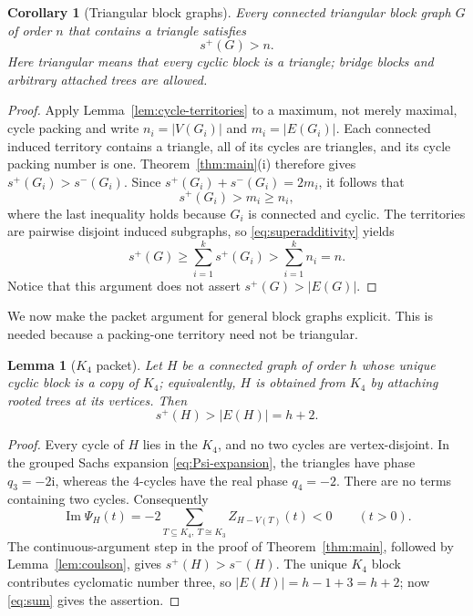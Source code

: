 \documentclass[11pt]{article}
\newtheorem{lemma}[theorem]{Lemma}
\newtheorem{corollary}[theorem]{Corollary}
\theoremstyle{definition}
\theoremstyle{remark}
\newcommand{\ii}{\mathrm{i}}
\begin{document}
\begin{corollary}[Triangular block graphs]\label{cor:triangular-block}
Every connected triangular block graph $G$ of order $n$ that contains a
triangle satisfies
\[
 s^+(G)>n.
\]
Here triangular means that every cyclic block is a triangle; bridge blocks
and arbitrary attached trees are allowed.
\end{corollary}

\begin{proof}
Apply Lemma~\ref{lem:cycle-territories} to a maximum, not merely maximal,
cycle packing and write $n_i=|V(G_i)|$ and $m_i=|E(G_i)|$.  Each connected
induced territory contains a triangle, all of its cycles are triangles, and
its cycle packing number is one.  Theorem~\ref{thm:main}(i) therefore gives
$s^+(G_i)>s^-(G_i)$.  Since
$s^+(G_i)+s^-(G_i)=2m_i$, it follows that
\[
 s^+(G_i)>m_i\ge n_i,
\]
where the last inequality holds because $G_i$ is connected and cyclic.
The territories are pairwise disjoint induced subgraphs, so
\eqref{eq:superadditivity} yields
\[
 s^+(G)\ge\sum_{i=1}^k s^+(G_i)
 >\sum_{i=1}^k n_i=n.
\]
Notice that this argument does not assert $s^+(G)>|E(G)|$.
\end{proof}

We now make the packet argument for general block graphs explicit.  This is
needed because a packing-one territory need not be triangular.

\begin{lemma}[$K_4$ packet]\label{lem:K4-packet}
Let $H$ be a connected graph of order $h$ whose unique cyclic block is a
copy of $K_4$; equivalently, $H$ is obtained from $K_4$ by attaching rooted
trees at its vertices.  Then
\[
 s^+(H)>|E(H)|=h+2.
\]
\end{lemma}

\begin{proof}
Every cycle of $H$ lies in the $K_4$, and no two cycles are vertex-disjoint.
In the grouped Sachs expansion \eqref{eq:Psi-expansion}, the triangles have
phase $q_3=-2\ii$, whereas the $4$-cycles have the real phase $q_4=-2$.
There are no terms containing two cycles.  Consequently
\[
 \operatorname{Im}\Psi_H(t)
 =-2\sum_{T\subseteq K_4,\ T\cong K_3}Z_{H-V(T)}(t)<0
 \qquad(t>0).
\]
The continuous-argument step in the proof of Theorem~\ref{thm:main}, followed
by Lemma~\ref{lem:coulson}, gives $s^+(H)>s^-(H)$.  The unique $K_4$ block
contributes cyclomatic number three, so $|E(H)|=h-1+3=h+2$; now
\eqref{eq:sum} gives the assertion.
\end{proof}
\end{document}

